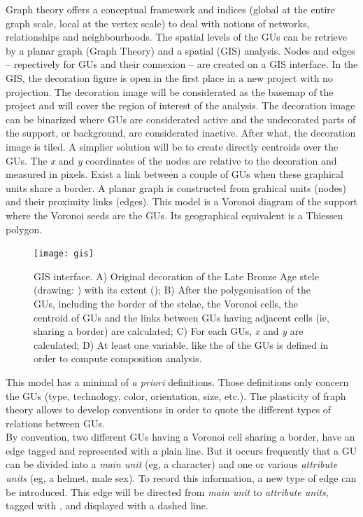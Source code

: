\documentclass[article]{jss}
\begin{document}
Graph theory offers a conceptual framework and indices (global at the entire graph scale, local at the vertex scale) to deal with notions of networks, relationships and neighbourhoods. The spatial levels of the GUs can be retrieve by a planar graph (Graph Theory) and a spatial (GIS) analysis.
Nodes and edges -- repectively for GUs and their connexion -- are created on a GIS interface. 
In the GIS, the decoration figure is open in the first place in a new project with no projection. The decoration image will be considerated as the basemap of the project and will cover the region of interest of the analysis. The decoration image can be binarized where GUs are considerated active and the undecorated parts of the support, or background, are considerated inactive. After what, the decoration image is tiled. A simplier solution will be to create directly centroids over the GUs. The \emph{x} and \emph{y} coordinates of the nodes are relative to the decoration and measured in pixels.
Exist a link between a couple of GUs when these graphical units share a border. A planar graph is constructed from grahical units (nodes) and their proximity links (edges). This model is a Voronoi diagram of the support where the Voronoi seeds are the GUs. Its geographical equivalent is a Thiessen polygon.


\begin{figure}[H]
\centering
\texttt{[image: gis]}
\caption{\label{fig:gis} GIS interface. A) Original decoration of the Late Bronze Age  stele (drawing: \cite{DiazGuardamino10}) with its extent (); B) After the polygonisation of the GUs, including the border of the stelae, the Voronoi cells, the centroid of GUs and the links between GUs having adjacent cells (ie, sharing a border) are calculated; C) For each GUs, \emph{x} and \emph{y} are calculated; D) At least one variable, like the  of the GUs is defined in order to compute composition analysis.}
\end{figure}

This model has a minimal of \emph{a priori} definitions. Those definitions only concern the GUs (type, technology, color, orientation, size, etc.). The plasticity of fraph theory allows to develop conventions in order to quote the different types of relations between GUs.\\
By convention, two different GUs having a Voronoi cell sharing a border, have an edge tagged  and represented with a plain line. But it occurs frequently that a GU can be divided into a \emph{main unit} (eg, a character) and one or various \emph{attribute units} (eg, a helmet, male sex). To record this information, a new type of edge can be introduced. This edge will be directed from \emph{main unit} to \emph{attribute units}, tagged with , and displayed with a dashed line.
\end{document}
